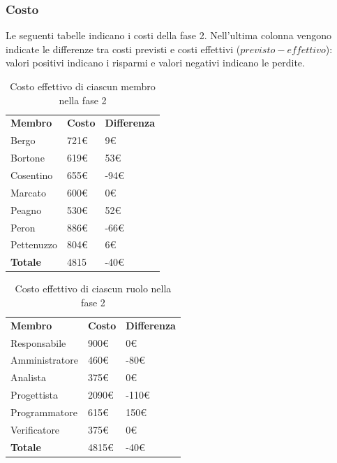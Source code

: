 	\subsubsection{Costo}
	Le seguenti tabelle indicano i costi della fase 2. Nell'ultima colonna vengono indicate le differenze tra costi previsti e costi effettivi ($previsto - effettivo$): valori positivi indicano i risparmi e valori negativi indicano le perdite.
		
	\begin{table}[H]
		\centering
		\begin{tabular}{| l | l | l |}
			\rowcolor{LightBlue}
			\textbf{\color{white}Membro}
			& \textbf{\color{white}Costo}
			& \textbf{\color{white}Differenza}\\
			Bergo		& 721€	& 9€\\
			Bortone		& 619€	& 53€\\
			Cosentino	& 655€	& -94€\\
			Marcato		& 600€	& 0€\\
			Peagno		& 530€	& 52€\\
			Peron		& 886€	& -66€\\
			Pettenuzzo	& 804€	& 6€\\ \hline
			\textbf{Totale} & 4815	& -40€\\ \hline
		\end{tabular}
		\caption{Costo effettivo di ciascun membro nella fase 2}	
	\end{table}
	
	\begin{table}[H]
		\centering
		\begin{tabular}{| l | l |l|}
			\rowcolor{LightBlue}
			\textbf{\color{white}Membro}
			& \textbf{\color{white}Costo}
			& \textbf{\color{white}Differenza}\\

			Responsabile	& 900€	& 0€\\
			Amministratore 	& 460€ 	& -80€\\
			Analista 		& 375€ 	& 0€\\
			Progettista 	& 2090€	& -110€\\
			Programmatore 	& 615€	& 150€\\
			Verificatore 	& 375€	& 0€\\ \hline
			\textbf{Totale} & 4815€	& -40€\\ \hline
		\end{tabular}
		\caption{Costo effettivo di ciascun ruolo nella fase 2}
	\end{table}
	
